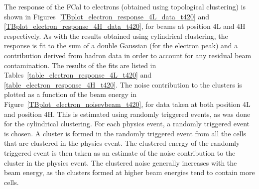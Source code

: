 The response of the FCal to electrons (obtained using topological clustering) is shown in Figures~\ref{TBplot_electron_response_4L_data_t420} and \ref{TBplot_electron_response_4H_data_t420}, for beams at position 4L and 4H respectively. As with the results obtained using cylindrical clustering, the response is fit to the sum of a double Gaussian (for the electron peak) and a contribution derived from hadron data in order to account for any residual beam contamination. The results of the fits are listed in Tables~\ref{table_electron_response_4L_t420} and \ref{table_electron_response_4H_t420}. The noise contribution to the clusters is plotted as a function of the beam energy in Figure~\ref{TBplot_electron_noisevbeam_t420}, for data taken at both position 4L and position 4H. This is estimated using randomly triggered events, as was done for the cylindrical clustering. For each physics event, a randomly triggered event is chosen. A cluster is formed in the randomly triggered event from all the cells that are clustered in the physics event. The clustered energy of the randomly triggered event is then taken as an estimate of the noise contribution to the cluster in the physics event. The clustered noise generally increases with the beam energy, as the clusters formed at higher beam energies tend to contain more cells. 
%




